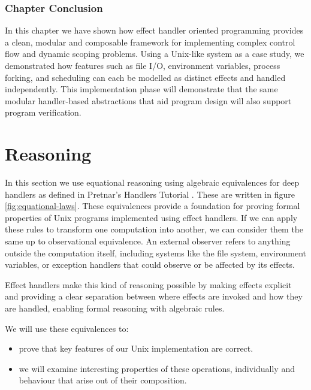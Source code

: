\documentclass[logo,bsc,singlespacing,parskip]{infthesis}
\begin{document}
\subsection*{Chapter Conclusion}

In this chapter we have shown how effect handler oriented programming provides a clean, modular and composable framework for implementing complex control flow and dynamic scoping problems. Using a Unix-like system as a case study, we demonstrated how features such as file I/O, environment variables, process forking, and scheduling can each be modelled as distinct effects and handled independently. This implementation phase will demonstrate that the same modular handler-based abstractions that aid program design will also support program verification.



\chapter{Reasoning}

In this section we use equational reasoning using algebraic equivalences for deep handlers as defined in Pretnar's Handlers Tutorial \cite{pretnar_introduction_2015}. These are written in figure \ref{fig:equational-laws}.  These equivalences provide a foundation for proving formal properties of Unix programs implemented using effect handlers. If we can apply these rules to transform one computation into another, we can consider them the same up to observational equivalence.
An external observer refers to anything outside the computation itself, including systems like the file system, environment variables, or exception handlers that could observe or be affected by its effects.

Effect handlers make this kind of reasoning possible by making effects explicit and providing a clear separation between where effects are invoked and how they are handled, enabling formal reasoning with algebraic rules.

We will use these equivalences to:
\begin{itemize}
    \item prove that key features of our Unix implementation are correct. 
    \item we will examine interesting properties of these operations, individually and behaviour that arise out of their composition. 
\end{itemize}
\end{document}
